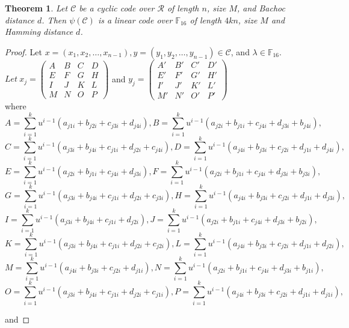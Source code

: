 \documentclass{amsart}
\newtheorem{theorem}{Theorem}[section]
\theoremstyle{definition}
\theoremstyle{remark}
\numberwithin{equation}{section}
\begin{document}
  
  	\begin{theorem}
		Let $\mathcal{C}$ be a cyclic code over $\mathcal{R}$ of length $n$, size $M$, and Bachoc distance $d$. Then $\psi(\mathcal{C})$ is a linear code over $\mathbb F_{16}$ of length $4kn$, size $M$ and Hamming distance $d$.
	\end{theorem}
 \begin{proof}
     Let $x= (x_1,x_2,\dots,x_{n-1}), y= (y_1,y_2,\dots,y_{n-1}) \in \mathcal{C} $, and $\lambda \in \mathbb F_{16} $.\\
   \allowdisplaybreaks
    $  Let~ x_j = \begin{pmatrix}
      A & B & C & D \\
      E & F & G & H \\
      I & J & K & L \\
      M & N & O & P
  \end{pmatrix}  $
    and $y_j = \begin{pmatrix}
      A' & B' & C' & D' \\
      E' & F' & G' & H' \\
      I' & J' & K' & L' \\
      M' & N' & O' & P'
  \end{pmatrix}$ \\

   where 
$$A = \sum_{i=1}^{k}u^{i-1}(a_{j1i}+b_{j2i}+c_{j3i}+d_{j4i}),
B = \sum_{i=1}^{k}u^{i-1}(a_{j2i}+b_{j1i}+c_{j4i}+d_{j3i}+b_{j4i}),$$
$$C = \sum_{i=1}^{k}u^{i-1}(a_{j3i}+b_{j4i}+c_{j1i}+d_{j2i}+c_{j4i}),
D = \sum_{i=1}^{k}u^{i-1}(a_{j4i}+b_{j3i}+c_{j2i}+d_{j1i}+d_{j4i}),$$
$$E = \sum_{i=1}^{k}u^{i-1}(a_{j2i}+b_{j1i}+c_{j4i}+d_{j3i}),
F = \sum_{i=1}^{k}u^{i-1}(a_{j2i}+b_{j1i}+c_{j4i}+d_{j3i}+b_{j3i}),$$
$$G = \sum_{i=1}^{k}u^{i-1}(a_{j3i}+b_{j4i}+c_{j1i}+d_{j2i}+c_{j3i}),
H = \sum_{i=1}^{k}u^{i-1}(a_{j4i}+b_{j3i}+c_{j2i}+d_{j1i}+d_{j3i}),$$
$$I = \sum_{i=1}^{k}u^{i-1}(a_{j3i}+b_{j4i}+c_{j1i}+d_{j2i}),
J = \sum_{i=1}^{k}u^{i-1}(a_{j2i}+b_{j1i}+c_{j4i}+d_{j3i}+b_{j2i}),$$
$$K = \sum_{i=1}^{k}u^{i-1}(a_{j3i}+b_{j4i}+c_{j1i}+d_{j2i}+c_{j2i}),
L = \sum_{i=1}^{k}u^{i-1}(a_{j4i}+b_{j3i}+c_{j2i}+d_{j1i}+d_{j2i}),$$
$$M = \sum_{i=1}^{k}u^{i-1}(a_{j4i}+b_{j3i}+c_{j2i}+d_{j1i}),
N = \sum_{i=1}^{k}u^{i-1}(a_{j2i}+b_{j1i}+c_{j4i}+d_{j3i}+b_{j1i}),$$
$$O = \sum_{i=1}^{k}u^{i-1}(a_{j3i}+b_{j4i}+c_{j1i}+d_{j2i}+c_{j1i}),
P = \sum_{i=1}^{k}u^{i-1}(a_{j4i}+b_{j3i}+c_{j2i}+d_{j1i}+d_{j1i}),$$

and 
    

\end{proof}
\end{document}
